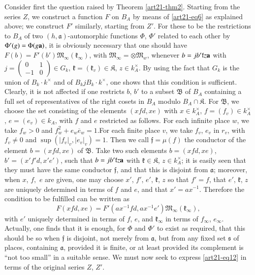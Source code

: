 Consider first the question raised by Theorem \ref{art21-thm2}. Starting from the series $Z$, we construct a function $F$ on $B_{A}$ by means of \eqref{art21-eq6} as explained above; we construct $F'$ similarly, starting from $Z'$. For these to be the restrictions to $B_{A}$ of two $(h,\mathfrak{a})$-automorphic functions $\Phi$, $\Phi'$ related to each other by $\Phi'(g)=\Phi(g\mathbf{a})$, it is obviously necessary that one should have $F(b)=F'(b')\mathfrak{M}_{\infty}(\mathfrak{k}_{\infty})$, with $\mathfrak{M}_{\infty}=\otimes \mathfrak{M}_{w}$, whenever $b=jb'\mathfrak{k}z\mathbf{a}$ with $j=\left(\begin{smallmatrix} 0 & 1\\ -1 & 0\end{smallmatrix}\right)\in G_{k}$, $\mathfrak{k}=(\mathfrak{k}_{v})\in \mathfrak{K}$, $z\in k^{\times}_{A}$. By using the fact that $G_{k}$ is the union of $B_{k}\cdot k^{\times}$ and of $B_{k}jB_{k}\cdot k^{\times}$, one shows that this condition is sufficient. Clearly, it is not affected if one restricts $b$, $b'$ to a subset $\mathfrak{B}$ of $B_{A}$ containing a full set of representatives of the right cosets in $B_{A}$ modulo $B_{A}\cap \mathfrak{K}$. For $\mathfrak{B}$, we choose the set consisting of the elements $(xfd,xe)$ with $x\in k^{\times}_{A}$, $f=(f_{v})\in k^{\times}_{A}$, $e=(e_{v})\in k_{A}$, with $f$ and $e$ restricted as follows. For each infinite place $w$, we take $f_{w}>0$ and $f^{2}_{w}+e_{w}\overline{e}_{w}=1$.\pageoriginale For each finite place $v$, we take $f_{v}$, $e_{v}$ in $r_{v}$, with $f_{v}\neq 0$ and $\sup (|f_{v}|_{v},|e_{v}|_{v})=1$. Then we call $\mathfrak{f}=\mu(f)$ the conductor of the element $b=(xfd,xe)$ of $\mathfrak{B}$. Take two such elements $b=(xfd,xe)$, $b'=(x'f'd,x'e')$, such that $b=jb'\mathfrak{k}z\mathbf{a}$ with $\mathfrak{k}\in \mathfrak{K}$, $z\in k^{\times}_{A}$; it is easily seen that they must have the same conductor $\mathfrak{f}$, and that this is disjoint from $\mathfrak{a}$; moreover, when $x$, $f,$ $e$ are given, one may choose $x'$, $f'$, $e'$, $\mathfrak{k}$, $z$ so that $f'=f$, that $e'$, $\mathfrak{k}$, $z$ are uniquely determined in terms of $f$ and $e$, and that $x'=ax^{-1}$. Therefore the condition to be fulfilled can be written as
\begin{equation}
F(xfd,xe)=F'(ax^{-1}fd, ax^{-1}e')\mathfrak{M}_{\infty}(\mathfrak{k}_{\infty}),\label{art21-eq12}
\end{equation}
with $e'$ uniquely determined in terms of $f$, $e$, and $\mathfrak{k}_{\infty}$ in terms of $f_{\infty}$, $e_{\infty}$. Actually, one finds that it is enough, for $\Phi$ and $\Phi'$ to exist as required, that this should be so when $\mathfrak{f}$ is disjoint, not merely from $\mathfrak{a}$, but from any fixed set $\mathfrak{s}$ of places, containing $\mathfrak{a}$, provided it is finite, or at least provided its complement is ``not too small'' in a suitable sense. We must now seek to express \eqref{art21-eq12} in terms of the original series $Z$, $Z'$.

